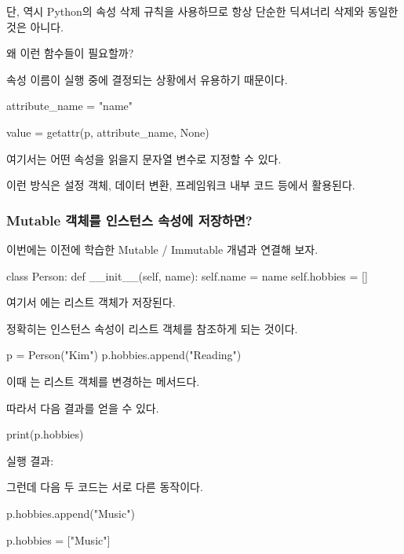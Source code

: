 단,  역시 Python의 속성 삭제 규칙을 사용하므로 항상 단순한 딕셔너리 삭제와 동일한 것은 아니다.

왜 이런 함수들이 필요할까?

속성 이름이 실행 중에 결정되는 상황에서 유용하기 때문이다.

\begin{dhkcode}
attribute_name = "name"

value = getattr(p, attribute_name, None)
\end{dhkcode}

여기서는 어떤 속성을 읽을지 문자열 변수로 지정할 수 있다.

이런 방식은 설정 객체, 데이터 변환, 프레임워크 내부 코드 등에서 활용된다.

\subsubsection{Mutable 객체를 인스턴스 속성에 저장하면?}

이번에는 이전에 학습한 Mutable / Immutable 개념과 연결해 보자.

\begin{dhkcode}
class Person:
    def __init__(self, name):
        self.name = name
        self.hobbies = []
\end{dhkcode}

여기서 에는 리스트 객체가 저장된다.

정확히는 인스턴스 속성이 리스트 객체를 참조하게 되는 것이다.

\begin{dhkcode}
p = Person("Kim")
p.hobbies.append("Reading")
\end{dhkcode}

이때 는 리스트 객체를 변경하는 메서드다.

따라서 다음 결과를 얻을 수 있다.

\begin{dhkcode}
print(p.hobbies)
\end{dhkcode}

실행 결과:

\begin{dhkzsh}
['Reading']
\end{dhkzsh}

그런데 다음 두 코드는 서로 다른 동작이다.

\begin{dhkcode}
p.hobbies.append("Music")

p.hobbies = ["Music"]
\end{dhkcode}

